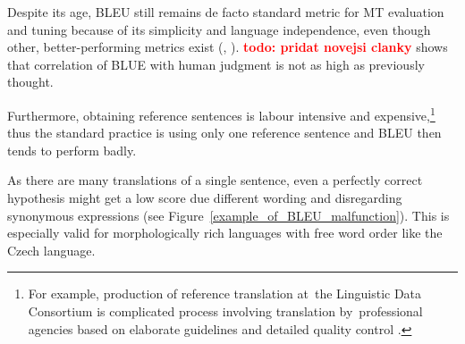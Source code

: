 \documentclass[11pt]{article}
\def \todo#1{\textbf{\textcolor{red}{todo: #1}}}
\def\Fref#1{Figure~\ref{#1}}
\begin{document}
Despite its age, BLEU still remains de facto standard metric for MT evaluation 
and tuning because of its simplicity and language independence, even though 
other, better-performing metrics exist (, 
). \todo{pridat novejsi clanky}  shows that 
correlation of BLUE with human judgment is not as high as previously thought.

Furthermore, obtaining reference sentences is labour intensive and 
expensive,\footnote{For example, production of reference translation  at~the 
Linguistic Data Consortium is complicated process involving translation 
by~professional agencies based on elaborate guidelines and detailed quality 
control \cite{strassel}.} thus the standard practice is using only one 
reference sentence and BLEU then tends to perform badly. 

As there are many translations of a single sentence, even a perfectly correct 
hypothesis might get a low score due different wording and disregarding 
synonymous expressions (see \Fref{example_of_BLEU_malfunction}). This is 
especially valid for morphologically rich languages with free word order 
like the Czech language. \cite{bojar-tackling-sparse-data}
\end{document}

